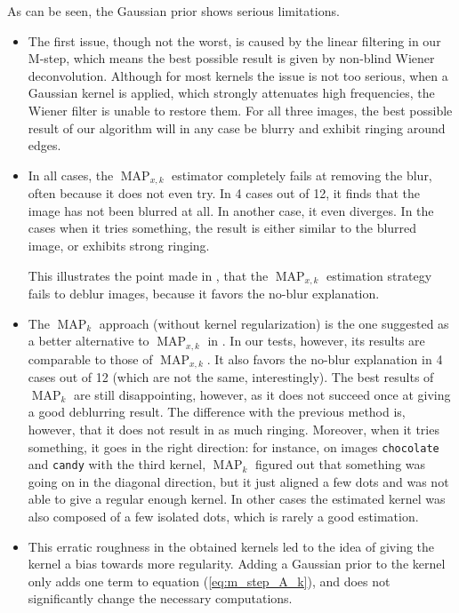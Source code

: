 \documentclass[english,a4paper]{article}
\theoremstyle{plain}
\theoremstyle{definition}
\theoremstyle{remark}
\DeclareMathOperator{\MAP}{MAP}
\begin{document}
As can be seen, the Gaussian prior shows serious limitations.
\begin{itemize}
	\item The first issue, though not the worst, is caused by the linear filtering in our M-step, which means the best possible result is given by non-blind Wiener deconvolution.
	Although for most kernels the issue is not too serious, when a Gaussian kernel is applied, which strongly attenuates high frequencies, the Wiener filter is unable to restore them.
	For all three images, the best possible result of our algorithm will in any case be blurry and exhibit ringing around edges.
	
	\item In all cases, the $\MAP_{x,k}$ estimator completely fails at removing the blur, often because it does not even try.
	In 4 cases out of 12, it finds that the image has not been blurred at all. In another case, it even diverges.
	In the cases when it tries something, the result is either similar to the blurred image, or exhibits strong ringing.
	
	This illustrates the point made in \cite{levin2009understanding}, that the $\MAP_{x,k}$ estimation strategy fails to deblur images, because it favors the no-blur explanation.
	
	\item The $\MAP_k$ approach (without kernel regularization) is the one suggested as a better alternative to $\MAP_{x,k}$ in \cite{levin2009understanding}.
	In our tests, however, its results are comparable to those of $\MAP_{x,k}$.
	It also favors the no-blur explanation in 4 cases out of 12 (which are not the same, interestingly).
	The best results of $\MAP_k$ are still disappointing, however, as it does not succeed once at giving a good deblurring result.
	The difference with the previous method is, however, that it does not result in as much ringing. Moreover, when it tries something, it goes in the right direction: for instance, on images \texttt{chocolate} and \texttt{candy} with the third kernel, $\MAP_k$ figured out that something was going on in the diagonal direction, but it just aligned a few dots and was not able to give a regular enough kernel.
	In other cases the estimated kernel was also composed of a few isolated dots, which is rarely a good estimation.
	
	\item This erratic roughness in the obtained kernels led to the idea of giving the kernel a bias towards more regularity. Adding a Gaussian prior to the kernel only adds one term to equation (\ref{eq:m_step_A_k}), and does not significantly change the necessary computations.
	

\end{itemize}
\end{document}
